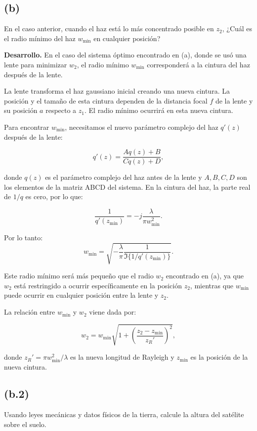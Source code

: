 \documentclass[11pt]{article}
\begin{document}
\subsection*{(b)}
En el caso anterior, cuando el haz está lo más concentrado posible en \(z_2\), ¿Cuál es el radio mínimo del haz \(w_{\min}\) en cualquier posición?

\vspace{0.5em}
\noindent\textbf{Desarrollo.}
En el caso del sistema óptimo encontrado en (a), donde se usó una lente para minimizar \(w_2\), el radio mínimo \(w_{\min}\) corresponderá a la cintura del haz después de la lente.

La lente transforma el haz gaussiano inicial creando una nueva cintura. La posición y el tamaño de esta cintura dependen de la distancia focal \(f\) de la lente y su posición \(a\) respecto a \(z_1\). El radio mínimo ocurrirá en esta nueva cintura.

Para encontrar \(w_{\min}\), necesitamos el nuevo parámetro complejo del haz \(q'(z)\) después de la lente:

\[
q'(z) = \frac{Aq(z) + B}{Cq(z) + D},
\]

donde \(q(z)\) es el parámetro complejo del haz antes de la lente y \(A,B,C,D\) son los elementos de la matriz ABCD del sistema. En la cintura del haz, la parte real de \(1/q\) es cero, por lo que:

\[
\frac{1}{q'(z_{\text{min}})} = -j\frac{\lambda}{\pi w_{\min}^2}.
\]

Por lo tanto:
\[
w_{\min} = \sqrt{-\frac{\lambda}{\pi}\frac{1}{\Im\{1/q'(z_{\text{min}})\}}}.
\]

Este radio mínimo será más pequeño que el radio \(w_2\) encontrado en (a), ya que \(w_2\) está restringido a ocurrir específicamente en la posición \(z_2\), mientras que \(w_{\min}\) puede ocurrir en cualquier posición entre la lente y \(z_2\).

La relación entre \(w_{\min}\) y \(w_2\) viene dada por:

\[
w_2 = w_{\min}\sqrt{1 + \left(\frac{z_2 - z_{\min}}{z_R'}\right)^2},
\]

donde \(z_R' = \pi w_{\min}^2/\lambda\) es la nueva longitud de Rayleigh y \(z_{\min}\) es la posición de la nueva cintura.

\subsection*{(b.2)}
Usando leyes mecánicas y datos físicos de la tierra, calcule la altura del satélite sobre el suelo.
\end{document}
